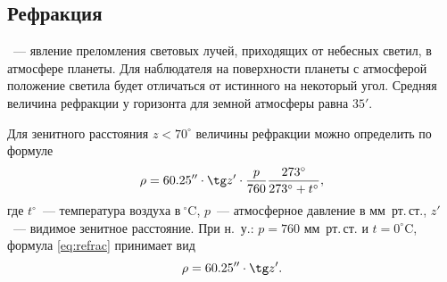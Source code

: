 \subsection{Рефракция}
~--- явление преломления световых лучей, приходящих от небесных светил, в атмосфере планеты. Для наблюдателя на поверхности планеты с атмосферой положение светила будет отличаться от истинного на некоторый угол. Средняя величина рефракции у горизонта для земной атмосферы равна $35'$.

Для зенитного расстояния $z < 70^\circ$ величины рефракции можно определить по формуле
\begin{equation}
\rho = 60.25'' \cdot \tg z' \cdot \frac{p}{760} \frac{273^{\circ}}{273^{\circ}+ t^{\circ}},
	\label{eq:refrac}
\end{equation}
где $t^{\circ}$~--- температура воздуха в$~^\circ$C, $p$~--- атмосферное давление в мм~рт.\,ст., $z'$~--- видимое зенитное расстояние. При н.~у.: $p = 760$ мм~рт.\,ст. и $t = 0^{\circ}$C, формула \eqref{eq:refrac} принимает вид
\begin{equation}
	\rho = 60.25'' \cdot \tg z'.
\end{equation}